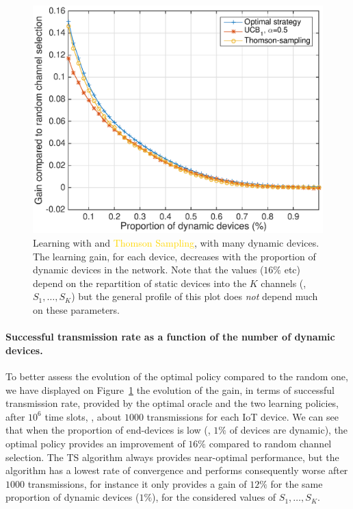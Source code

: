 \begin{figure}[!h]
    \centering
    \includegraphics[scale=0.80]{perf_learning.eps}
    \caption[Learning with \UCB{} and Thomson Sampling, with many dynamic devices]{Learning with \textcolor{red}{\UCB} and \textcolor{gold}{Thomson Sampling}, with many dynamic devices. The learning gain, for each device, decreases with the proportion of dynamic devices in the network. Note that the values ($16\%$ etc) depend on the repartition of static devices into the $K$ channels (\ie, $S_1,\dots,S_K$) but the general profile of this plot does \emph{not} depend much on these parameters.}
    \label{fig:41:perf_learning}
\end{figure}


\paragraph{Successful transmission rate as a function of the number of dynamic devices.}
%
To better assess the evolution of the optimal policy compared to the random one, we have displayed on Figure~\ref{fig:41:perf_learning} the evolution of the gain, in terms of successful transmission rate, provided by the optimal oracle and the two learning policies, after $10^6$ time slots, \ie, about $1000$ transmissions for each IoT device.
We can see that when the proportion of end-devices is low (\eg, $1\%$ of devices are dynamic), the optimal policy provides an improvement of $16\%$ compared to random channel selection.
The TS algorithm always provides near-optimal performance, but the \UCB{} algorithm has a lowest rate of convergence and performs consequently worse after $1000$ transmissions, for instance it only provides a gain of $12\%$ for the same proportion of dynamic devices ($1\%$),
for the considered values of $S_1,\dots,S_K$.

